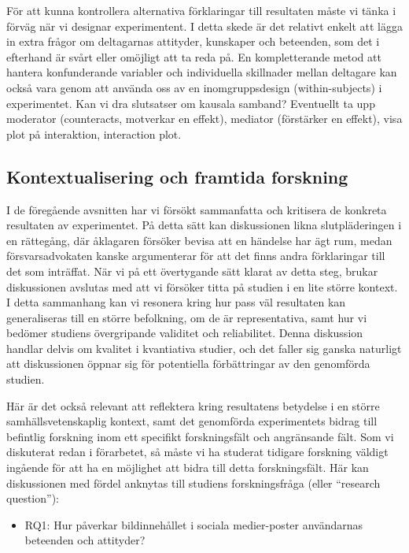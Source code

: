 \documentclass[
]{book}
\providecommand{\tightlist}{%
  \setlength{\itemsep}{0pt}\setlength{\parskip}{0pt}}
\begin{document}
För att kunna kontrollera alternativa förklaringar till resultaten måste vi tänka i förväg när vi designar experimentent. I detta skede är det relativt enkelt att lägga in extra frågor om deltagarnas attityder, kunskaper och beteenden, som det i efterhand är svårt eller omöjligt att ta reda på. En kompletterande metod att hantera konfunderande variabler och individuella skillnader mellan deltagare kan också vara genom att använda oss av en inomgruppsdesign (within-subjects) i experimentet. Kan vi dra slutsatser om kausala samband? Eventuellt ta upp moderator (counteracts, motverkar en effekt), mediator (förstärker en effekt), visa plot på interaktion, interaction plot.

\hypertarget{sub08.2.3}{%
\subsection{Kontextualisering och framtida forskning}\label{sub08.2.3}}

I de föregående avsnitten har vi försökt sammanfatta och kritisera de konkreta resultaten av experimentet. På detta sätt kan diskussionen likna slutpläderingen i en rättegång, där åklagaren försöker bevisa att en händelse har ägt rum, medan försvarsadvokaten kanske argumenterar för att det finns andra förklaringar till det som inträffat. När vi på ett övertygande sätt klarat av detta steg, brukar diskussionen avslutas med att vi försöker titta på studien i en lite större kontext. I detta sammanhang kan vi resonera kring hur pass väl resultaten kan generaliseras till en större befolkning, om de är representativa, samt hur vi bedömer studiens övergripande validitet och reliabilitet. Denna diskussion handlar delvis om kvalitet i kvantiativa studier, och det faller sig ganska naturligt att diskussionen öppnar sig för potentiella förbättringar av den genomförda studien.

Här är det också relevant att reflektera kring resultatens betydelse i en större samhällsvetenskaplig kontext, samt det genomförda experimentets bidrag till befintlig forskning inom ett specifikt forskningsfält och angränsande fält. Som vi diskuterat redan i förarbetet, så måste vi ha studerat tidigare forskning väldigt ingående för att ha en möjlighet att bidra till detta forskningsfält. Här kan diskussionen med fördel anknytas till studiens forskningsfråga (eller ``research question''):

\begin{itemize}
\tightlist
\item
  RQ1: Hur påverkar bildinnehållet i sociala medier-poster användarnas beteenden och attityder?
\end{itemize}
\end{document}

